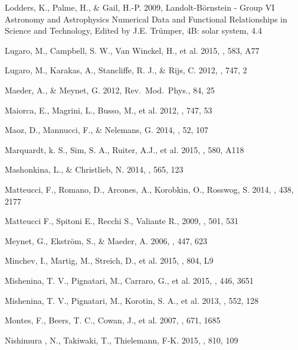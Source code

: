 \documentclass[manuscript]{aastex}
\begin{document}
\begin{thebibliography}{}
Lodders, K., Palme, H., \& Gail, H.-P. 2009, Landolt-B{\"o}rnstein - Group VI 
Astronomy and Astrophysics Numerical Data and Functional Relationships in Science 
and Technology, Edited by J.E. Tr{\"u}mper, 4B: solar system, 4.4 

Lugaro, M., Campbell, S. W., Van Winckel, H., et al. 2015, \aap, 583, A77

Lugaro, M., Karakas, A., Stancliffe, R. J., \& Rijs, C. 2012, \apj, 747, 2

Maeder, A., \& Meynet, G. 2012, Rev.\ Mod.\ Phys., 84, 25

Maiorca, E., Magrini, L., Busso, M., et al. 2012, \apj, 747, 53

Maoz, D., Mannucci, F., \& Nelemans, G. 2014, \araa, 52, 107

Marquardt, k. S., Sim, S. A., Ruiter, A.J., et al. 2015, \aap, 580, A118

Mashonkina, L., \& Christlieb, N. 2014, \aap, 565, 123

Matteucci, F., Romano, D., Arcones, A., Korobkin, O., Rosswog, S. 2014, \mnras, 438, 2177

Matteucci F., Spitoni E., Recchi S., Valiante R., 2009, \aap, 501, 531

Meynet, G., Ekstr{\"o}m, S., \& Maeder, A. 2006, \aap, 447, 623

Minchev, I., Martig, M., Streich, D., et al. 2015, \apj, 804, L9

Mishenina, T. V., Pignatari, M., Carraro, G., et al. 2015, \mnras, 446, 3651

Mishenina, T. V., Pignatari, M., Korotin, S. A., et al. 2013, \aap, 552, 128

Montes, F., Beers, T. C., Cowan, J., et al. 2007, \apj, 671, 1685

Nishimura , N., Takiwaki, T., Thielemann, F-K. 2015, \apj, 810, 109


\end{thebibliography}
\end{document}
